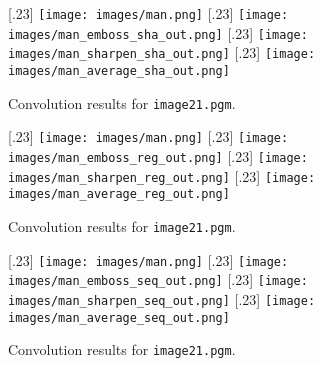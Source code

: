 \begin{figure}[h]
  \centering
  [.23\linewidth]{%
    \texttt{[image: images/man.png]}}
  \hfill
  [.23\linewidth]{%
    \texttt{[image: images/man\_emboss\_sha\_out.png]}}
  \hfill
  [.23\linewidth]{%
    \texttt{[image: images/man\_sharpen\_sha\_out.png]}}
  \hfill
  [.23\linewidth]{%
    \texttt{[image: images/man\_average\_sha\_out.png]}}
  \caption{Convolution results for \texttt{image21.pgm}.}
  \label{fig:image21_results}
\end{figure}
\begin{figure}[h]
  \centering
  [.23\linewidth]{%
    \texttt{[image: images/man.png]}}
  \hfill
  [.23\linewidth]{%
    \texttt{[image: images/man\_emboss\_reg\_out.png]}}
  \hfill
  [.23\linewidth]{%
    \texttt{[image: images/man\_sharpen\_reg\_out.png]}}
  \hfill
  [.23\linewidth]{%
    \texttt{[image: images/man\_average\_reg\_out.png]}}
  \caption{Convolution results for \texttt{image21.pgm}.}
  \label{fig:image21_results}
\end{figure}
\begin{figure}[h]
  \centering
  [.23\linewidth]{%
    \texttt{[image: images/man.png]}}
  \hfill
  [.23\linewidth]{%
    \texttt{[image: images/man\_emboss\_seq\_out.png]}}
  \hfill
  [.23\linewidth]{%
    \texttt{[image: images/man\_sharpen\_seq\_out.png]}}
  \hfill
  [.23\linewidth]{%
    \texttt{[image: images/man\_average\_seq\_out.png]}}
  \caption{Convolution results for \texttt{image21.pgm}.}
  \label{fig:image21_results}
\end{figure}

